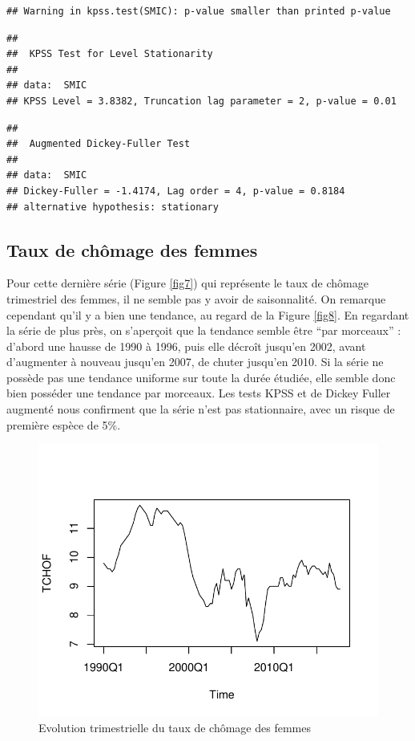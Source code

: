 \documentclass[11pt,]{article}
\begin{document}
\begin{verbatim}
## Warning in kpss.test(SMIC): p-value smaller than printed p-value
\end{verbatim}

\begin{verbatim}
## 
##  KPSS Test for Level Stationarity
## 
## data:  SMIC
## KPSS Level = 3.8382, Truncation lag parameter = 2, p-value = 0.01
\end{verbatim}

\begin{verbatim}
## 
##  Augmented Dickey-Fuller Test
## 
## data:  SMIC
## Dickey-Fuller = -1.4174, Lag order = 4, p-value = 0.8184
## alternative hypothesis: stationary
\end{verbatim}

\subsection{\texorpdfstring{Taux de chômage des femmes
\label{TCHOF}}{Taux de chômage des femmes }}\label{taux-de-chomage-des-femmes}

Pour cette dernière série (Figure \ref{fig7}) qui représente le taux de
chômage trimestriel des femmes, il ne semble pas y avoir de
saisonnalité. On remarque cependant qu'il y a bien une tendance, au
regard de la Figure \ref{fig8}. En regardant la série de plus près, on
s'aperçoit que la tendance semble être ``par morceaux'' : d'abord une
hausse de 1990 à 1996, puis elle décroît jusqu'en 2002, avant
d'augmenter à nouveau jusqu'en 2007, de chuter jusqu'en 2010. Si la
série ne possède pas une tendance uniforme sur toute la durée étudiée,
elle semble donc bien posséder une tendance par morceaux. Les tests KPSS
et de Dickey Fuller augmenté nous confirment que la série n'est pas
stationnaire, avec un risque de première espèce de 5\%.

\begin{figure}

{\centering \includegraphics{Rapport_final_files/figure-latex/unnamed-chunk-7-1} 

}

\caption{\label{fig7} Evolution trimestrielle du taux de chômage des femmes}\label{fig:unnamed-chunk-7}
\end{figure}
\end{document}

